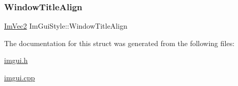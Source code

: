 \subsubsection{\texorpdfstring{Window\+Title\+Align}{WindowTitleAlign}}
{\footnotesize\ttfamily \mbox{\hyperlink{struct_im_vec2}{Im\+Vec2}} Im\+Gui\+Style\+::\+Window\+Title\+Align}



The documentation for this struct was generated from the following files\+:\begin{DoxyCompactItemize}
\item 
\mbox{\hyperlink{imgui_8h}{imgui.\+h}}\item 
\mbox{\hyperlink{imgui_8cpp}{imgui.\+cpp}}\end{DoxyCompactItemize}

